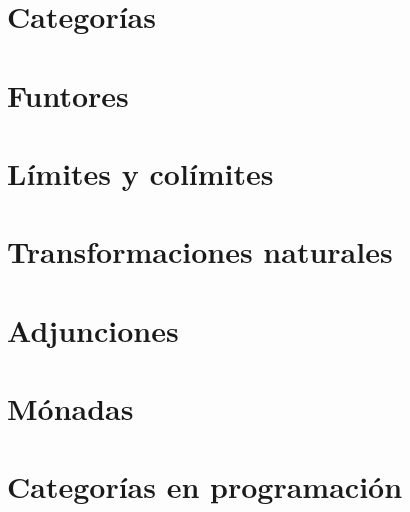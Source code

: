 \documentclass[11pt,twoside]{amsbook}
\theoremstyle{definition}
\theoremstyle{remark}
\begin{document}
\chapter{Categorías}


\chapter{Funtores}


\chapter{Límites y colímites}


\chapter{Transformaciones naturales}


\chapter{Adjunciones}


\chapter{Mónadas}


\appendix
\chapter{Categorías en programación}
\label{ch:programming}


\printbibliography
\end{document}
